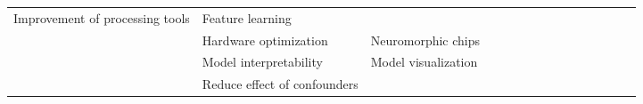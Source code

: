 \begin{tabular}{p{1.5cm}p{1.5cm}p{1.5cm}p{1.5cm}p{0.6cm}p{0.6cm}p{0.6cm}p{0.6cm}p{0.6cm}p{0.6cm}p{0.6cm}p{0.6cm}p{0.6cm}p{0.6cm}p{0.6cm}}
Improvement of processing tools & Feature learning &   &   &                          \cite{Wen2018, Stober2015, Li2015} &                                                                                                        \cite{Bashivan2016a} &                                                                        &                                      &                                                            &                      &                         &                               &                     &                         &                                                                      \\
                                & Hardware optimization & Neuromorphic chips &   &                                                             &                                                                                                            \cite{Nurse2016} &                                                                        &                                      &                                                            &                      &                         &              \cite{Yepes2017} &                     &                         &                                                                      \\
                                & Model interpretability & Model visualization &   &                                                             &                                                                                                        \cite{Hartmann2018b} &                                                                        &                                      &                                                            &                      &                         &              \cite{Sturm2016} &                     &                         &                                                                      \\
                                & Reduce effect of confounders &   &   &                                                             &                                                                                                                             &                                                                        &                                      &                                                            &                      &                         &                               &                     &                         &                                                        \cite{Wu2018} \\

\end{tabular}
